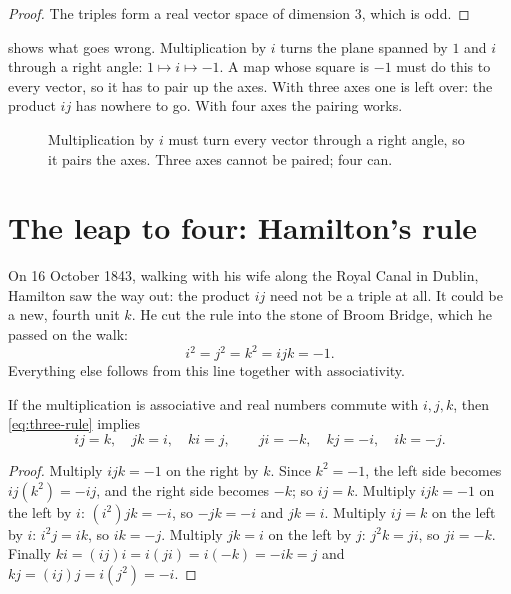 \begin{proof}
The triples form a real vector space of dimension $3$, which is odd.
\end{proof}

 shows what goes wrong. Multiplication by $i$ turns the plane spanned by $1$ and $i$ through a right angle: $1\mapsto i\mapsto-1$. A map whose square is $-1$ must do this to every vector, so it has to pair up the axes. With three axes one is left over: the product $ij$ has nowhere to go. With four axes the pairing works.

\begin{figure}[htbp]
  \centering\scalebox{1.25}{}
  \caption{Multiplication by $i$ must turn every vector through a right angle, so it pairs the axes. Three axes cannot be paired; four can.}
  \label{fig:three-pairing}
\end{figure}

\section{The leap to four: Hamilton's rule}

On 16 October 1843, walking with his wife along the Royal Canal in Dublin, Hamilton saw the way out: the product $ij$ need not be a triple at all. It could be a new, fourth unit $k$. He cut the rule into the stone of Broom Bridge, which he passed on the walk:
\begin{equation}\label{eq:three-rule}
  i^2=j^2=k^2=ijk=-1 .
\end{equation}
Everything else follows from this line together with associativity.

\begin{proposition}\label{prop:three-six}
If the multiplication is associative and real numbers commute with $i,j,k$, then \eqref{eq:three-rule} implies
\[
  ij=k,\quad jk=i,\quad ki=j,\qquad ji=-k,\quad kj=-i,\quad ik=-j .
\]
\end{proposition}

\begin{proof}
Multiply $ijk=-1$ on the right by $k$. Since $k^2=-1$, the left side becomes $ij(k^2)=-ij$, and the right side becomes $-k$; so $ij=k$.
Multiply $ijk=-1$ on the left by $i$: $(i^2)jk=-i$, so $-jk=-i$ and $jk=i$.
Multiply $ij=k$ on the left by $i$: $i^2j=ik$, so $ik=-j$.
Multiply $jk=i$ on the left by $j$: $j^2k=ji$, so $ji=-k$.
Finally $ki=(ij)i=i(ji)=i(-k)=-ik=j$ and $kj=(ij)j=i(j^2)=-i$.
\end{proof}

